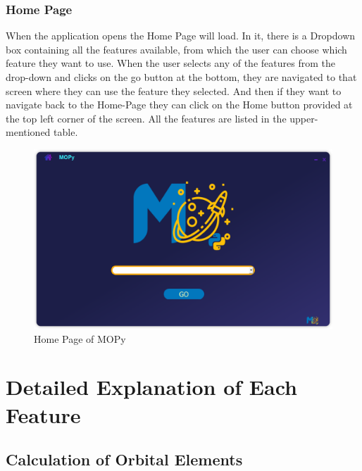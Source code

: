 \documentclass[12pt]{article}
\begin{document}
\subsubsection{Home Page}
When the application opens the Home Page will load. In it, there is a Dropdown box containing all the features available, from which the user can choose which feature they want to use. When the user selects any of the features from the drop-down and clicks on the go button at the bottom, they are navigated to that screen where they can use the feature they selected. And then if they want to navigate back to the Home-Page they can click on the Home button provided at the top left corner of the screen. All the features are listed in the upper-mentioned table.
\begin{figure}[H]
\centering
\includegraphics[scale=0.5]{homepage.png}
\caption{Home Page of MOPy} \label{home}
\end{figure}
\section{Detailed Explanation of Each Feature}
\subsection{Calculation of Orbital Elements}
\end{document}
